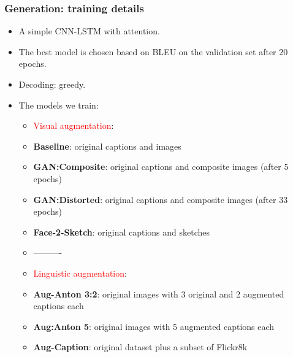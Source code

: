 \documentclass[aspectratio=1610]{beamer} %
\begin{document}
\begin{frame}
\frametitle{Generation: training details}
\begin{itemize}

	\item A simple CNN-LSTM with attention.
	\item The best model is chosen based on BLEU on the validation set after $20$ epochs.
	\item Decoding: greedy.
	\pause
	\item The models we train:
		\begin{itemize}
			\item \textcolor{red}{Visual augmentation}:
			\item \textbf{Baseline}: original captions and images
			\item \textbf{GAN:Composite}: original captions and composite images (after 5 epochs)
			\item \textbf{GAN:Distorted}: original captions and composite images (after 33 epochs)
			\item \textbf{Face-2-Sketch}: original captions and sketches  
			\item[] ----------
			\item \textcolor{red}{Linguistic augmentation}:
			\item \textbf{Aug-Anton 3:2}: original images with 3 original and 2 augmented captions each
			\item \textbf{Aug:Anton 5}: original images with 5 augmented captions each
			\item \textbf{Aug-Caption}: original dataset plus a subset of Flickr8k
		\end{itemize}

\end{itemize}
\end{frame}



\end{document}
